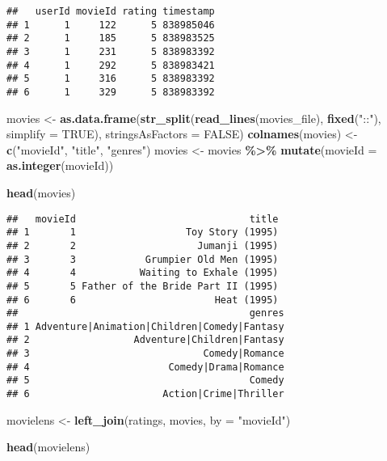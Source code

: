 \documentclass[
]{article}
\newenvironment{Shaded}{\begin{snugshade}}{\end{snugshade}}
\newcommand{\AttributeTok}[1]{\textcolor[rgb]{0.13,0.29,0.53}{#1}}
\newcommand{\ConstantTok}[1]{\textcolor[rgb]{0.56,0.35,0.01}{#1}}
\newcommand{\FunctionTok}[1]{\textcolor[rgb]{0.13,0.29,0.53}{\textbf{#1}}}
\newcommand{\NormalTok}[1]{#1}
\newcommand{\OtherTok}[1]{\textcolor[rgb]{0.56,0.35,0.01}{#1}}
\newcommand{\SpecialCharTok}[1]{\textcolor[rgb]{0.81,0.36,0.00}{\textbf{#1}}}
\newcommand{\StringTok}[1]{\textcolor[rgb]{0.31,0.60,0.02}{#1}}
\begin{document}
\begin{verbatim}
##   userId movieId rating timestamp
## 1      1     122      5 838985046
## 2      1     185      5 838983525
## 3      1     231      5 838983392
## 4      1     292      5 838983421
## 5      1     316      5 838983392
## 6      1     329      5 838983392
\end{verbatim}

\begin{Shaded}
\begin{Highlighting}[]
\NormalTok{movies }\OtherTok{\textless{}{-}} \FunctionTok{as.data.frame}\NormalTok{(}\FunctionTok{str\_split}\NormalTok{(}\FunctionTok{read\_lines}\NormalTok{(movies\_file), }\FunctionTok{fixed}\NormalTok{(}\StringTok{"::"}\NormalTok{), }\AttributeTok{simplify =} \ConstantTok{TRUE}\NormalTok{),}
                        \AttributeTok{stringsAsFactors =} \ConstantTok{FALSE}\NormalTok{)}
\FunctionTok{colnames}\NormalTok{(movies) }\OtherTok{\textless{}{-}} \FunctionTok{c}\NormalTok{(}\StringTok{"movieId"}\NormalTok{, }\StringTok{"title"}\NormalTok{, }\StringTok{"genres"}\NormalTok{)}
\NormalTok{movies }\OtherTok{\textless{}{-}}\NormalTok{ movies }\SpecialCharTok{\%\textgreater{}\%}
  \FunctionTok{mutate}\NormalTok{(}\AttributeTok{movieId =} \FunctionTok{as.integer}\NormalTok{(movieId))}

\FunctionTok{head}\NormalTok{(movies)}
\end{Highlighting}
\end{Shaded}

\begin{verbatim}
##   movieId                              title
## 1       1                   Toy Story (1995)
## 2       2                     Jumanji (1995)
## 3       3            Grumpier Old Men (1995)
## 4       4           Waiting to Exhale (1995)
## 5       5 Father of the Bride Part II (1995)
## 6       6                        Heat (1995)
##                                        genres
## 1 Adventure|Animation|Children|Comedy|Fantasy
## 2                  Adventure|Children|Fantasy
## 3                              Comedy|Romance
## 4                        Comedy|Drama|Romance
## 5                                      Comedy
## 6                       Action|Crime|Thriller
\end{verbatim}

\begin{Shaded}
\begin{Highlighting}[]
\NormalTok{movielens }\OtherTok{\textless{}{-}} \FunctionTok{left\_join}\NormalTok{(ratings, movies, }\AttributeTok{by =} \StringTok{"movieId"}\NormalTok{)}

\FunctionTok{head}\NormalTok{(movielens)}
\end{Highlighting}
\end{Shaded}
\end{document}

